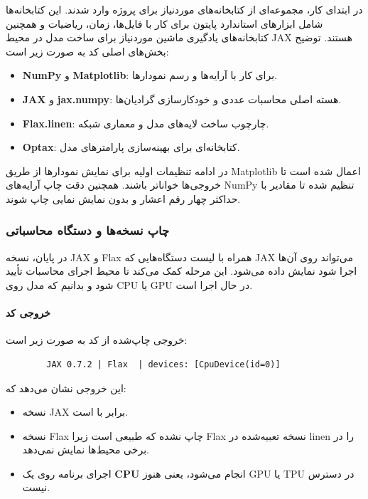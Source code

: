 \documentclass{article}
\begin{document}
در ابتدای کار، مجموعه‌ای از کتابخانه‌های موردنیاز برای پروژه وارد شدند. این کتابخانه‌ها شامل ابزارهای استاندارد پایتون برای کار با فایل‌ها، زمان، ریاضیات و همچنین کتابخانه‌های یادگیری ماشین موردنیاز برای ساخت مدل در محیط JAX هستند. توضیح بخش‌های اصلی کد به صورت زیر است:

\begin{itemize}
	\item \textbf{NumPy} و \textbf{Matplotlib}: برای کار با آرایه‌ها و رسم نمودارها.
	\item \textbf{JAX} و \textbf{jax.numpy}: هسته اصلی محاسبات عددی و خودکارسازی گرادیان‌ها.
	\item \textbf{Flax.linen}: چارچوب ساخت لایه‌های مدل و معماری شبکه.
	\item \textbf{Optax}: کتابخانه‌ای برای بهینه‌سازی پارامترهای مدل.
\end{itemize}

در ادامه تنظیمات اولیه برای نمایش نمودارها از طریق Matplotlib اعمال شده است تا خروجی‌ها خواناتر باشند. همچنین دقت چاپ آرایه‌های NumPy تنظیم شده تا مقادیر با حداکثر چهار رقم اعشار و بدون نمایش نمایی چاپ شوند.

\subsubsection*{چاپ نسخه‌ها و دستگاه محاسباتی}
در پایان، نسخه JAX و Flax همراه با لیست دستگاه‌هایی که JAX می‌تواند روی آن‌ها اجرا شود نمایش داده می‌شود. این مرحله کمک می‌کند تا محیط اجرای محاسبات تأیید شود و بدانیم که مدل روی CPU یا GPU در حال اجرا است.

\paragraph{خروجی کد}
خروجی چاپ‌شده از کد به صورت زیر است:
\begin{latin}
	\begin{verbatim}
		JAX 0.7.2 | Flax  | devices: [CpuDevice(id=0)]
	\end{verbatim}
\end{latin}
این خروجی نشان می‌دهد که:
\begin{itemize}
	\item نسخه JAX برابر با  است.
	\item نسخه Flax چاپ نشده که طبیعی است زیرا Flax نسخه تعبیه‌شده در linen را در برخی محیط‌ها نمایش نمی‌دهد.
	\item اجرای برنامه روی یک \textbf{CPU} انجام می‌شود، یعنی هنوز GPU یا TPU در دسترس نیست.
\end{itemize}
\end{document}
